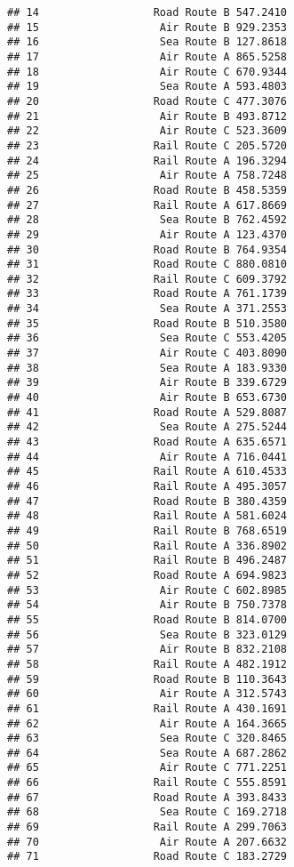 \documentclass[
]{article}
\begin{document}
\begin{verbatim}
## 14                  Road Route B 547.2410
## 15                   Air Route B 929.2353
## 16                   Sea Route B 127.8618
## 17                   Air Route A 865.5258
## 18                   Air Route C 670.9344
## 19                   Sea Route A 593.4803
## 20                  Road Route C 477.3076
## 21                   Air Route B 493.8712
## 22                   Air Route C 523.3609
## 23                  Rail Route C 205.5720
## 24                  Rail Route A 196.3294
## 25                   Air Route A 758.7248
## 26                  Road Route B 458.5359
## 27                  Rail Route A 617.8669
## 28                   Sea Route B 762.4592
## 29                   Air Route A 123.4370
## 30                  Road Route B 764.9354
## 31                  Road Route C 880.0810
## 32                  Rail Route C 609.3792
## 33                  Road Route A 761.1739
## 34                   Sea Route A 371.2553
## 35                  Road Route B 510.3580
## 36                   Sea Route C 553.4205
## 37                   Air Route C 403.8090
## 38                   Sea Route A 183.9330
## 39                   Air Route B 339.6729
## 40                   Air Route B 653.6730
## 41                  Road Route A 529.8087
## 42                   Sea Route A 275.5244
## 43                  Road Route A 635.6571
## 44                   Air Route A 716.0441
## 45                  Rail Route A 610.4533
## 46                  Rail Route A 495.3057
## 47                  Road Route B 380.4359
## 48                  Rail Route A 581.6024
## 49                  Rail Route B 768.6519
## 50                  Rail Route A 336.8902
## 51                  Rail Route B 496.2487
## 52                  Road Route A 694.9823
## 53                   Air Route C 602.8985
## 54                   Air Route B 750.7378
## 55                  Road Route B 814.0700
## 56                   Sea Route B 323.0129
## 57                   Air Route B 832.2108
## 58                  Rail Route A 482.1912
## 59                  Road Route B 110.3643
## 60                   Air Route A 312.5743
## 61                  Rail Route A 430.1691
## 62                   Air Route A 164.3665
## 63                   Sea Route C 320.8465
## 64                   Sea Route A 687.2862
## 65                   Air Route C 771.2251
## 66                  Rail Route C 555.8591
## 67                  Road Route A 393.8433
## 68                   Sea Route C 169.2718
## 69                  Rail Route A 299.7063
## 70                   Air Route A 207.6632
## 71                  Road Route C 183.2729

\end{verbatim}
\end{document}
